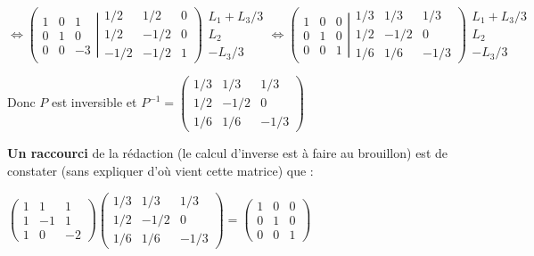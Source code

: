 \begin{correction}
\begin{enumerate}
\begin{enumerate}
$\Leftrightarrow \left( \left. 
\begin{array}{rrr}
1 & 0 & 1 \\ 
0 & 1 & 0 \\ 
0 & 0 & -3%
\end{array}
\right| 
\begin{array}{rrr}
1/2 & 1/2 & 0 \\ 
1/2 & -1/2 & 0 \\ 
-1/2 & -1/2 & 1%
\end{array}
\right) 
\begin{array}{c}
L_{1}+L_{3}/3 \\ 
L_{2} \\ 
-L_{3}/3%
\end{array}
\Leftrightarrow \left( \left. 
\begin{array}{rrr}
1 & 0 & 0 \\ 
0 & 1 & 0 \\ 
0 & 0 & 1%
\end{array}
\right| 
\begin{array}{rrr}
1/3 & 1/3 & 1/3 \\ 
1/2 & -1/2 & 0 \\ 
1/6 & 1/6 & -1/3%
\end{array}
\right) 
\begin{array}{c}
L_{1}+L_{3}/3 \\ 
L_{2} \\ 
-L_{3}/3%
\end{array}
$

Donc $P$ est inversible et $P^{-1}=\left( 
\begin{array}{rrr}
1/3 & 1/3 & 1/3 \\ 
1/2 & -1/2 & 0 \\ 
1/6 & 1/6 & -1/3%
\end{array}
\right) $

\textbf{Un raccourci} de la r\'{e}daction (le calcul d'inverse est \`{a}
faire au brouillon) est de constater (sans expliquer d'o\`{u} vient cette
matrice) que :

$\left( 
\begin{array}{rrr}
1 & 1 & 1 \\ 
1 & -1 & 1 \\ 
1 & 0 & -2%
\end{array}
\right) \left( 
\begin{array}{rrr}
1/3 & 1/3 & 1/3 \\ 
1/2 & -1/2 & 0 \\ 
1/6 & 1/6 & -1/3%
\end{array}
\right) =\allowbreak \left( 
\begin{array}{ccc}
1 & 0 & 0 \\ 
0 & 1 & 0 \\ 
0 & 0 & 1%
\end{array}
\right) $


\end{enumerate}
\end{enumerate}
\end{correction}
